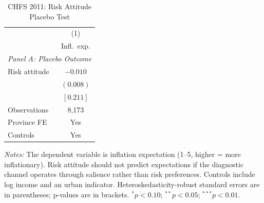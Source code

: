 \begin{table}[htbp]
\centering
\begin{threeparttable}
\caption{CHFS 2011: Risk Attitude Placebo Test}
\label{tab:chfs_risk_placebo}
{\small
\begin{tabular}{lc}
\toprule
 & (1) \\
 & Infl.\ exp. \\
\midrule
\multicolumn{2}{l}{\textit{Panel A: Placebo Outcome}} \\
\addlinespace
Risk attitude & $-0.010$ \\
 & $(0.008)$ \\
 & $[0.211]$ \\
\addlinespace
Observations & 8,173 \\
Province FE & Yes \\
Controls & Yes \\
\bottomrule
\end{tabular}
}
\begin{tablenotes}[flushleft]
\footnotesize
\item \textit{Notes:} The dependent variable is inflation expectation (1--5, higher = more inflationary). Risk attitude should not predict expectations if the diagnostic channel operates through salience rather than risk preferences. Controls include log income and an urban indicator. Heteroskedasticity-robust standard errors are in parentheses; p-values are in brackets. $^{*}p<0.10$; $^{**}p<0.05$; $^{***}p<0.01$.
\end{tablenotes}
\end{threeparttable}
\end{table}
